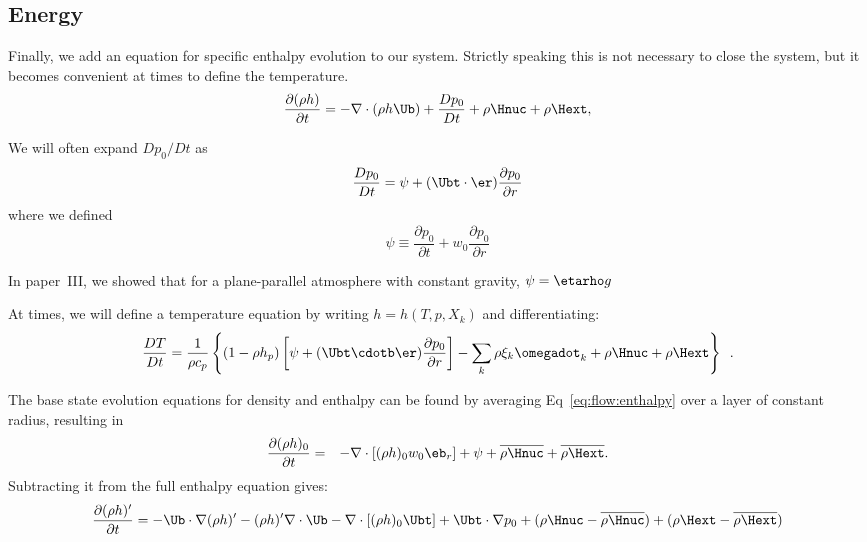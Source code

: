 \subsection{Energy}

Finally, we add an equation for specific enthalpy evolution to our
system.  Strictly speaking this is not necessary to close the system,
but it becomes convenient at times to define the temperature.
\begin{equation}
\frac{\partial(\rho h)}{\partial t} = 
   -\nabla\cdot(\rho h\Ub) + \frac{Dp_0}{Dt} + \rho\Hnuc + \rho\Hext,\label{eq:flow:enthalpy}
\end{equation}

We will often expand $Dp_0/Dt$ as
\begin{equation}
\frac{Dp_0}{Dt} = \psi + (\Ubt \cdot \er) \frac{\partial p_0}{\partial r}
\end{equation}
where we defined
\begin{equation}
\psi \equiv \frac{\partial p_0}{\partial t} + w_0 \frac{\partial p_0}{\partial r}
\end{equation}

In paper~III, we showed that for a plane-parallel atmosphere with constant gravity,
$\psi = \etarho g$


At times, we will define a temperature equation by writing $h = h(T,p,X_k)$
and differentiating:
\begin{equation}
\label{eq:tempenthalpypsi}
\frac{DT}{Dt} = \frac{1}{\rho c_p} \left\{ \left(1 - \rho h_p\right) \left 
  [ \psi + (\Ubt \cdotb \er) \frac{\partial p_0}{\partial r} \right ]
 - \sum_k \rho \xi_k {\omegadot}_k
 + \rho \Hnuc + \rho \Hext \right \} \enskip  .
\end{equation}

The base state evolution equations for density and enthalpy can be
found by averaging Eq~\ref{eq:flow:enthalpy}
over a layer of constant radius, resulting in
\begin{eqnarray}
\frac{\partial(\rho h)_0}{\partial t} &=& -\nabla\cdot\left[(\rho h)_0w_0\eb_r\right] +
  \psi + \overline{\rho \Hnuc} + \overline{\rho \Hext}. \label{eq:flow:enthalpy_base}
\end{eqnarray}
Subtracting it from the full enthalpy equation gives:
\begin{equation}
\frac{\partial(\rho h)'}{\partial t} = -\Ub\cdot\nabla(\rho h)' - (\rho h)'\nabla\cdot\Ub - 
  \nabla\cdot\left[(\rho h)_0\Ubt\right] + \Ubt\cdot\nabla p_0 
   + ( \rho\Hnuc - \overline{\rho \Hnuc}) + (\rho\Hext - \overline{\rho \Hext}) 
\end{equation}

